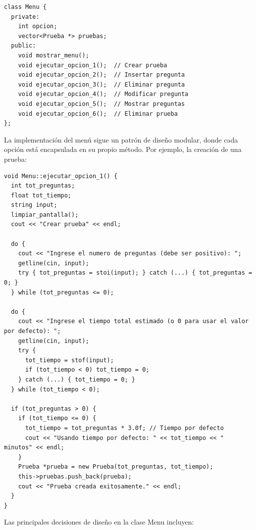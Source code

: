 \documentclass[12pt]{article}
\begin{document}
\begin{lstlisting}[style=customc]
class Menu {
  private:
    int opcion;
    vector<Prueba *> pruebas;
  public:
    void mostrar_menu();
    void ejecutar_opcion_1();  // Crear prueba
    void ejecutar_opcion_2();  // Insertar pregunta
    void ejecutar_opcion_3();  // Eliminar pregunta
    void ejecutar_opcion_4();  // Modificar pregunta
    void ejecutar_opcion_5();  // Mostrar preguntas
    void ejecutar_opcion_6();  // Eliminar prueba
};
\end{lstlisting}

La implementaci\'on del men\'u sigue un patr\'on de dise\~no modular, donde cada opci\'on est\'a encapsulada en su propio m\'etodo. Por ejemplo, la creaci\'on de una prueba:

\begin{lstlisting}[style=customc]
void Menu::ejecutar_opcion_1() {  
  int tot_preguntas;
  float tot_tiempo;
  string input;
  limpiar_pantalla();
  cout << "Crear prueba" << endl;
  
  do {
    cout << "Ingrese el numero de preguntas (debe ser positivo): ";
    getline(cin, input);
    try { tot_preguntas = stoi(input); } catch (...) { tot_preguntas = 0; }
  } while (tot_preguntas <= 0);

  do {
    cout << "Ingrese el tiempo total estimado (o 0 para usar el valor por defecto): ";
    getline(cin, input);
    try {
      tot_tiempo = stof(input);
      if (tot_tiempo < 0) tot_tiempo = 0;
    } catch (...) { tot_tiempo = 0; }
  } while (tot_tiempo < 0);

  if (tot_preguntas > 0) {
    if (tot_tiempo <= 0) {
      tot_tiempo = tot_preguntas * 3.0f; // Tiempo por defecto
      cout << "Usando tiempo por defecto: " << tot_tiempo << " minutos" << endl;
    }
    Prueba *prueba = new Prueba(tot_preguntas, tot_tiempo);
    this->pruebas.push_back(prueba);
    cout << "Prueba creada exitosamente." << endl;
  }  
}
\end{lstlisting}

Las principales decisiones de dise\~no en la clase Menu incluyen:
\end{document}
